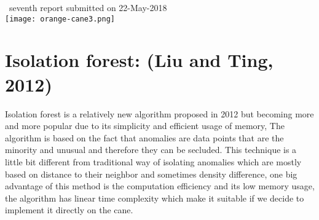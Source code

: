 \documentclass[a4paper, parskip=full]{scrartcl}
\begin{document}
\begin{titlepage}
	
	
	{\large \ seventh report submitted on 22-May-2018}\\[0.2cm] %
	
	
	\texttt{[image: orange-cane3.png]}\\[0.2cm] %
	
	
	\vfill %
	
\end{titlepage}







 \section*{Isolation forest: (Liu and Ting, 2012) }
 
Isolation forest is a relatively new algorithm proposed in 2012 but becoming more and more popular due to its simplicity and efficient usage of memory, The algorithm is based on the fact that anomalies are data points that are the minority and unusual and therefore they can be secluded. This technique is a little bit different from traditional way of isolating anomalies which are mostly based on distance to their neighbor and sometimes density difference, one big advantage of this method is the computation efficiency and its low memory usage, the algorithm has linear time complexity which make it suitable if we decide to implement it directly on the cane.
\end{document}
